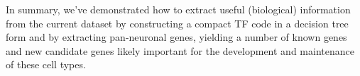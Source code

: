 In summary, we've demonstrated how to extract useful (biological) information from the current dataset by constructing a compact TF code in a decision tree form and by extracting pan-neuronal genes, yielding a number of known genes and new candidate genes likely important for the development and maintenance of these cell types.

